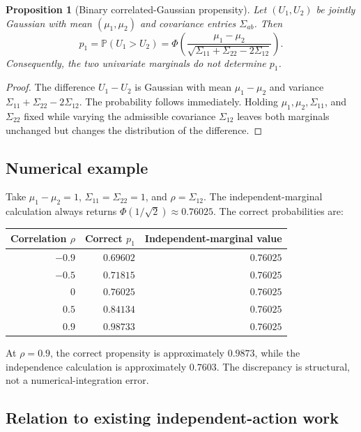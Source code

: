\documentclass[11pt]{article}
\newtheorem{proposition}[theorem]{Proposition}
\newcommand{\Prob}{\mathbb{P}}
\begin{document}
\begin{proposition}[Binary correlated-Gaussian propensity]
\label{prop:binary}
Let $(U_1, U_2)$ be jointly Gaussian with mean $(\mu_1, \mu_2)$ and covariance entries $\Sigma_{ab}$. Then
\[
p_1
=
\Prob(U_1 > U_2)
=
\Phi\!\left(
\frac{\mu_1 - \mu_2}
{\sqrt{\Sigma_{11} + \Sigma_{22} - 2\Sigma_{12}}}
\right).
\]
Consequently, the two univariate marginals do not determine $p_1$.
\end{proposition}

\begin{proof}
The difference $U_1 - U_2$ is Gaussian with mean $\mu_1 - \mu_2$ and variance $\Sigma_{11} + \Sigma_{22} - 2\Sigma_{12}$. The probability follows immediately. Holding $\mu_1, \mu_2, \Sigma_{11}$, and $\Sigma_{22}$ fixed while varying the admissible covariance $\Sigma_{12}$ leaves both marginals unchanged but changes the distribution of the difference.
\end{proof}

\subsection{Numerical example}
\label{sec:numexample}

Take $\mu_1 - \mu_2 = 1$, $\Sigma_{11} = \Sigma_{22} = 1$, and $\rho = \Sigma_{12}$. The independent-marginal calculation always returns $\Phi(1/\sqrt{2}) \approx 0.76025$. The correct probabilities are:

\begin{center}
\begin{tabular}{rrr}
\toprule
Correlation $\rho$ & Correct $p_1$ & Independent-marginal value \\
\midrule
$-0.9$ & $0.69602$ & $0.76025$ \\
$-0.5$ & $0.71815$ & $0.76025$ \\
$0$    & $0.76025$ & $0.76025$ \\
$0.5$  & $0.84134$ & $0.76025$ \\
$0.9$  & $0.98733$ & $0.76025$ \\
\bottomrule
\end{tabular}
\end{center}

At $\rho = 0.9$, the correct propensity is approximately $0.9873$, while the independence calculation is approximately $0.7603$. The discrepancy is structural, not a numerical-integration error.

\subsection{Relation to existing independent-action work}
\end{document}
